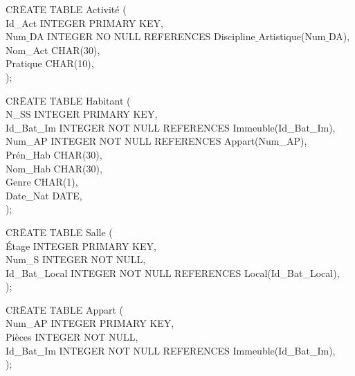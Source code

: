 \documentclass[a4paper,10.5pt]{report}
\begin{document}
		\begin{tabbing}
			CR\=EATE TABLE Activité (\\
			\> Id\_Act INTEGER PRIMARY KEY,\\
			\> Num$\_$DA INTEGER NO NULL REFERENCES Discipline$\_$Artistique(Num$\_$DA),\\
			\> Nom\_Act CHAR(30),\\
			\> Pratique CHAR(10),\\);
		\end{tabbing}

		\begin{tabbing}
			CR\=EATE TABLE Habitant (\\
			\> N\_SS INTEGER PRIMARY KEY,\\
			\> Id\_Bat\_Im INTEGER NOT NULL REFERENCES Immeuble(Id\_Bat\_Im),\\
			\> Num\_AP INTEGER NOT NULL REFERENCES Appart(Num\_AP),\\
			\> Prén\_Hab CHAR(30),\\
			\> Nom\_Hab CHAR(30),\\
			\> Genre CHAR(1),\\
			\> Date\_Nat DATE,\\);
		\end{tabbing}

		\begin{tabbing}
			CR\=EATE TABLE Salle (\\
			\> Étage INTEGER PRIMARY KEY,\\
			\> Num\_S INTEGER NOT NULL,\\
			\> Id\_Bat\_Local INTEGER NOT NULL REFERENCES Local(Id\_Bat\_Local),\\);
		\end{tabbing}

		\begin{tabbing}
			CR\=EATE TABLE Appart (\\
			\> Num\_AP INTEGER PRIMARY KEY,\\
			\> Pièces INTEGER NOT NULL,\\
			\> Id\_Bat\_Im INTEGER NOT NULL REFERENCES Immeuble(Id\_Bat\_Im),\\);
		\end{tabbing}
                                                   
\end{document}
